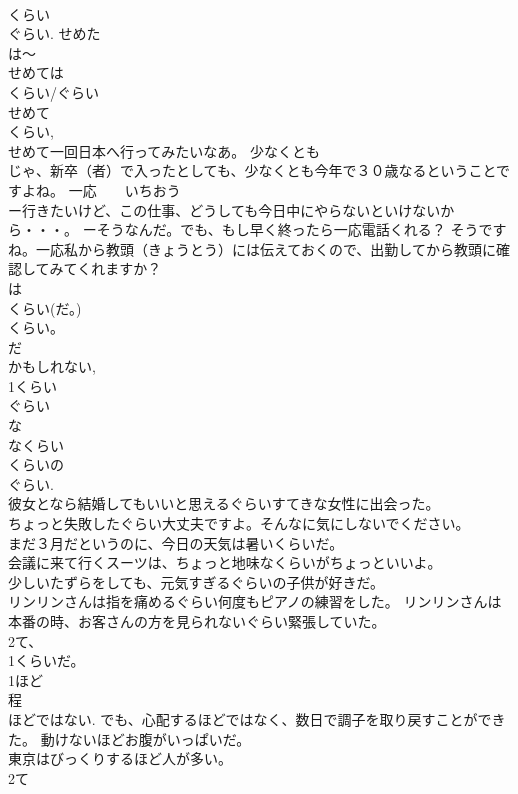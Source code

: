 \documentclass[8pt]{extreport}
\begin{document}
\begin{CJK}{UTF8}{min}
\\	くらい	
\\	ぐらい. せめた
\\	は～ 
\\	せめては
\\	くらい/ぐらい 
\\	せめて 
\\	くらい, 
\\	せめて一回日本へ行ってみたいなあ。 少なくとも 
\\	じゃ、新卒（者）で入ったとしても、少なくとも今年で３０歳なるということですよね。 一応　　いちおう 
\\	ー行きたいけど、この仕事、どうしても今日中にやらないといけないから・・・。 ーそうなんだ。でも、もし早く終ったら一応電話くれる？ そうですね。一応私から教頭（きょうとう）には伝えておくので、出勤してから教頭に確認してみてくれますか？ 
\\	は
\\	くらい(だ。) 
\\	くらい。　
\\	だ 
\\	かもしれない, 
\\	1くらい
\\	ぐらい 
\\	な
\\	なくらい 
\\	くらいの
\\	ぐらい. 
\\	彼女となら結婚してもいいと思えるぐらいすてきな女性に出会った。 
\\	ちょっと失敗したぐらい大丈夫ですよ。そんなに気にしないでください。 
\\	まだ３月だというのに、今日の天気は暑いくらいだ。 
\\	会議に来て行くスーツは、ちょっと地味なくらいがちょっといいよ。 
\\	少しいたずらをしても、元気すぎるぐらいの子供が好きだ。 
\\	リンリンさんは指を痛めるぐらい何度もピアノの練習をした。 リンリンさんは本番の時、お客さんの方を見られないぐらい緊張していた。 
\\	2て、
\\	1くらいだ。 
\\	1ほど
\\	程 
\\	ほどではない. でも、心配するほどではなく、数日で調子を取り戻すことができた。 動けないほどお腹がいっぱいだ。 
\\	東京はびっくりするほど人が多い。 
\\	2て

\end{CJK}
\end{document}
